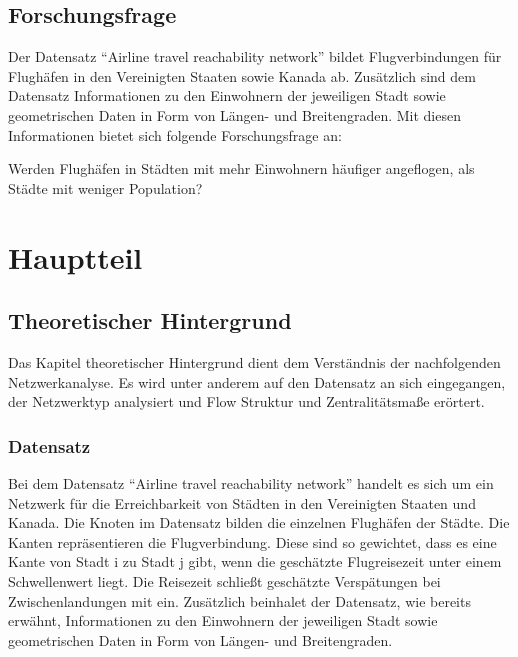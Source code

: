 \documentclass[]{article}
\begin{document}
\hypertarget{forschungsfrage}{%
\subsection{Forschungsfrage}\label{forschungsfrage}}

Der Datensatz ``Airline travel reachability network'' bildet
Flugverbindungen für Flughäfen in den Vereinigten Staaten sowie Kanada
ab. Zusätzlich sind dem Datensatz Informationen zu den Einwohnern der
jeweiligen Stadt sowie geometrischen Daten in Form von Längen- und
Breitengraden. Mit diesen Informationen bietet sich folgende
Forschungsfrage an:

Werden Flughäfen in Städten mit mehr Einwohnern häufiger angeflogen, als
Städte mit weniger Population?

\hypertarget{hauptteil}{%
\section{Hauptteil}\label{hauptteil}}

\hypertarget{theoretischer-hintergrund}{%
\subsection{Theoretischer Hintergrund}\label{theoretischer-hintergrund}}

Das Kapitel theoretischer Hintergrund dient dem Verständnis der
nachfolgenden Netzwerkanalyse. Es wird unter anderem auf den Datensatz
an sich eingegangen, der Netzwerktyp analysiert und Flow Struktur und
Zentralitätsmaße erörtert.

\hypertarget{datensatz}{%
\subsubsection{Datensatz}\label{datensatz}}

Bei dem Datensatz ``Airline travel reachability network'' handelt es
sich um ein Netzwerk für die Erreichbarkeit von Städten in den
Vereinigten Staaten und Kanada. Die Knoten im Datensatz bilden die
einzelnen Flughäfen der Städte. Die Kanten repräsentieren die
Flugverbindung. Diese sind so gewichtet, dass es eine Kante von Stadt i
zu Stadt j gibt, wenn die geschätzte Flugreisezeit unter einem
Schwellenwert liegt. Die Reisezeit schließt geschätzte Verspätungen bei
Zwischenlandungen mit ein. Zusätzlich beinhalet der Datensatz, wie
bereits erwähnt, Informationen zu den Einwohnern der jeweiligen Stadt
sowie geometrischen Daten in Form von Längen- und Breitengraden.
\end{document}
